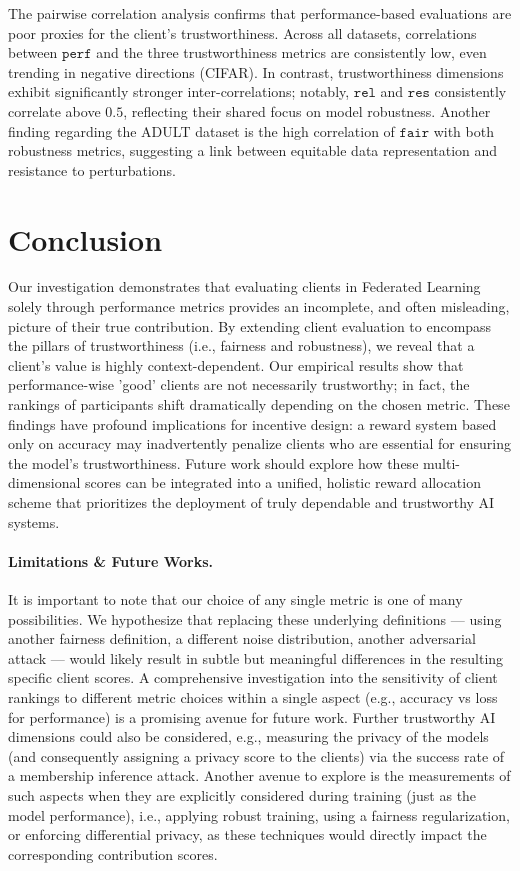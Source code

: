 \documentclass{uai2026}
\begin{document}
The pairwise correlation analysis confirms that performance-based evaluations are poor proxies for the client's trustworthiness. Across all datasets, correlations between $\mathtt{perf}$ and the three trustworthiness metrics are consistently low, even trending in negative directions (CIFAR). In contrast, trustworthiness dimensions exhibit significantly stronger inter-correlations; notably, $\mathtt{rel}$ and $\mathtt{res}$ consistently correlate above $0.5$, reflecting their shared focus on model robustness. Another finding regarding the ADULT dataset is the high correlation of $\mathtt{fair}$ with both robustness metrics, suggesting a link between equitable data representation and resistance to perturbations.

\section{Conclusion}
\label{sec:con}

Our investigation demonstrates that evaluating clients in Federated Learning solely through performance metrics provides an incomplete, and often misleading, picture of their true contribution. By extending client evaluation to encompass the pillars of trustworthiness (i.e., fairness and robustness), we reveal that a client's value is highly context-dependent. Our empirical results show that performance-wise 'good' clients are not necessarily trustworthy; in fact, the rankings of participants shift dramatically depending on the chosen metric. These findings have profound implications for incentive design: a reward system based only on accuracy may inadvertently penalize clients who are essential for ensuring the model's trustworthiness. Future work should explore how these multi-dimensional scores can be integrated into a unified, holistic reward allocation scheme that prioritizes the deployment of truly dependable and trustworthy AI systems.

\paragraph{Limitations \& Future Works. }

It is important to note that our choice of any single metric is one of many possibilities. We hypothesize that replacing these underlying definitions --- using another fairness definition, a different noise distribution, another adversarial attack --- would likely result in subtle but meaningful differences in the resulting specific client scores. A comprehensive investigation into the sensitivity of client rankings to different metric choices within a single aspect (e.g., accuracy vs loss for performance) is a promising avenue for future work. Further trustworthy AI dimensions could also be considered, e.g., measuring the privacy of the models (and consequently assigning a privacy score to the clients) via the success rate of a membership inference attack. Another avenue to explore is the measurements of such aspects when they are explicitly considered during training (just as the model performance), i.e., applying robust training, using a fairness regularization, or enforcing differential privacy, as these techniques would directly impact the corresponding contribution scores.
\end{document}
